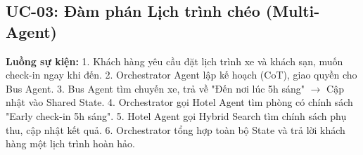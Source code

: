 \subsection{UC-03: Đàm phán Lịch trình chéo (Multi-Agent)}
\textbf{Luồng sự kiện:} 
1. Khách hàng yêu cầu đặt lịch trình xe và khách sạn, muốn check-in ngay khi đến.
2. Orchestrator Agent lập kế hoạch (CoT), giao quyền cho Bus Agent.
3. Bus Agent tìm chuyến xe, trả về "Đến nơi lúc 5h sáng" $\rightarrow$ Cập nhật vào Shared State.
4. Orchestrator gọi Hotel Agent tìm phòng có chính sách "Early check-in 5h sáng".
5. Hotel Agent gọi Hybrid Search tìm chính sách phụ thu, cập nhật kết quả.
6. Orchestrator tổng hợp toàn bộ State và trả lời khách hàng một lịch trình hoàn hảo.
